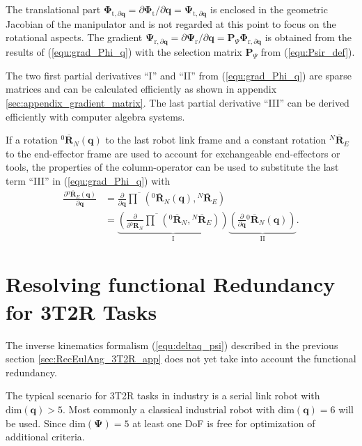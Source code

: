 \documentclass[twocolumn,10pt]{IFTOMM}
\newcommand{\bm}[1]{\boldsymbol{#1}}
\newcommand{\rotmato}[2]{{{ }^{#1}\boldsymbol{\overline{R}}}_{#2}}
\begin{document}
The translational part $\bm{\Phi}_{\mathrm{t},\partial\bm{q}}=\partial \bm{\Phi}_{\mathrm{t}} / \partial \bm{q}=\bm{\Psi}_{\mathrm{t},\partial\bm{q}}$ is enclosed in the geometric Jacobian of the manipulator and is not regarded at this point to focus on the rotational aspects.
The gradient 
$\bm{\Psi}_{\mathrm{r}, \partial\bm{q}}=\partial \bm{\Psi}_{\mathrm{r}} / \partial \bm{q}=\bm{P}_{\Psi}\bm{\Phi}_{\mathrm{r},\partial\bm{q}}$
is obtained from the results of (\ref{equ:grad_Phi_q}) with the selection matrix $\bm{P}_{\Psi}$ from (\ref{equ:Psir_def}).

The two first partial derivatives ``I'' and ``II'' from (\ref{equ:grad_Phi_q}) are sparse matrices and can be calculated efficiently as shown in appendix \ref{sec:appendix_gradient_matrix}.
The last partial derivative ``III'' can be derived efficiently with computer algebra systems.

If a rotation $\rotmato{0}{N}(\bm{q})$ to the last robot link frame and a constant rotation $\rotmato{N}{E}$ to the end-effector frame are used to account for exchangeable end-effectors or tools, the properties of the column-operator can be used to substitute the last term ``III'' in (\ref{equ:grad_Phi_q}) with
%
\begin{align}
\frac{\partial \rotmato{0}{E}(\bm{q})}{\partial \bm{q}} 
&=
\frac{\partial}{\partial \bm{q}} \overline{\prod}\left( \rotmato{0}{N}(\bm{q}), \rotmato{N}{E}\right) \label{equ:ee_rotation_gradq}\\
&=
\underbrace{\left(\frac{\partial}{\partial \rotmato{0}{N}} \overline{\prod}\left( \rotmato{0}{N}, \rotmato{N}{E}\right)\right)}_{\mathrm{I}}
\underbrace{\left(\frac{\partial}{\partial \bm{q}} \rotmato{0}{N}(\bm{q})\right)}_{\mathrm{II}}. \nonumber
\end{align}

\section{Resolving functional Redundancy for 3T2R Tasks}
\label{sec:ResFuncRed}


The inverse kinematics formalism (\ref{equ:deltaq_psi}) described in the previous section \ref{sec:RecEulAng_3T2R_app} does not yet take into account the functional redundancy.

The typical scenario for 3T2R tasks in industry is a serial link robot with $\mathrm{dim}(\bm{q})>5$.
Most commonly a classical industrial robot with $\mathrm{dim}(\bm{q})=6$ will be used.
Since $\mathrm{dim}(\bm{\Psi})=5$ at least one DoF is free for optimization of additional criteria.
\end{document}

